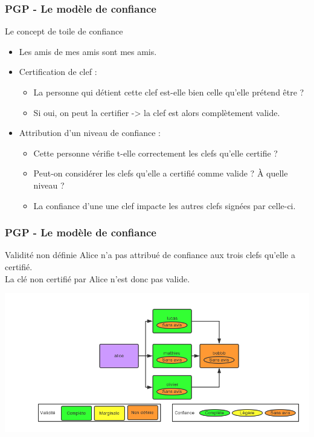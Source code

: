 \begin{frame}
  \frametitle{\color{white}PGP - Le modèle de confiance}
    \begin{block}{Le concept de toile de confiance}
    	\begin{itemize}
	  \item Les amis de mes amis sont mes amis.
	  \item Certification de clef :
	    \begin{itemize}
	     \item La personne qui détient cette clef est-elle bien celle qu'elle prétend être ?
	     \item Si oui, on peut la certifier -> la clef est alors complètement valide.
	    \end{itemize}
	  \item Attribution d'un niveau de confiance :
	    \begin{itemize}
	     \item Cette personne vérifie t-elle correctement les clefs qu'elle certifie ?
	     \item Peut-on considérer les clefs qu'elle a certifié comme valide ? À quelle niveau ?
	     \item La confiance d'une une clef impacte les autres clefs signées par celle-ci.
	    \end{itemize}	  
       \end{itemize} 
    \end{block}
\end{frame}
\begin{frame}
  \frametitle{\color{white}PGP - Le modèle de confiance}
    \begin{block}{Validité non définie}
      Alice n'a pas attribué de confiance aux trois clefs qu'elle a certifié.\\
      La clé non certifié par Alice n'est donc pas valide.
    \end{block}
    \includegraphics[scale=0.3]{tdcdemoUndefined.png}
\end{frame}
